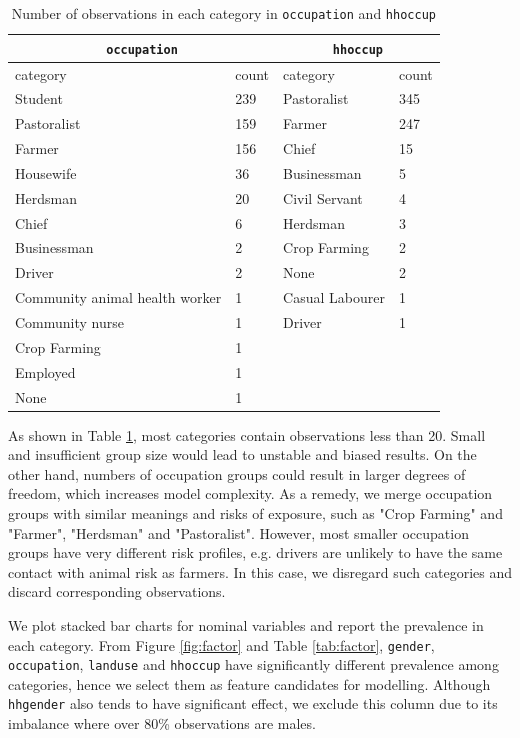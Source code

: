 \documentclass[11pt,twoside]{article}
\numberwithin{Theorem}{section}
\numberwithin{Definition}{section}
\numberwithin{Lemma}{section}
\numberwithin{Algorithm}{section}
\numberwithin{equation}{section}
\begin{document}
\begin{table}[!h]
	\centering
	\begin{tabular}{|l|l|l|l|}
		\hline
		\multicolumn{2}{|c|}{\texttt{occupation}} & \multicolumn{2}{|c|}{\texttt{hhoccup}} \\
		\hline
		category & 	count & category & count \\
		\hline
		Student & 239 & Pastoralist & 345 \\				
		Pastoralist & 159 & Farmer & 247 \\
		Farmer & 156 & Chief & 15 \\
		Housewife & 36	& Businessman & 5 \\			
		Herdsman & 20 & Civil Servant & 4 \\	
		Chief & 6 & Herdsman & 3 \\	
		Businessman & 2 & Crop Farming & 2 \\
		Driver & 2 & None & 2 \\
		Community animal health worker & 1 & Casual Labourer & 1 \\			
		Community nurse & 1	& Driver & 1 \\	
		Crop Farming & 1 & & \\			
		Employed & 1 & & \\
		None & 1 & & \\
		\hline
	\end{tabular}	
	\caption{Number of observations in each category in \texttt{occupation} and \texttt{hhoccup}}
	\label{tab:occ}
\end{table}

 As shown in Table \ref{tab:occ}, most categories contain observations less than 20. Small and insufficient group size would lead to unstable and biased results. On the other hand, numbers of occupation groups could result in larger degrees of freedom, which increases model complexity. As a remedy, we merge occupation groups with similar meanings and risks of exposure, such as "Crop Farming" and "Farmer", "Herdsman" and "Pastoralist". However, most smaller occupation groups have very different risk profiles, e.g. drivers are unlikely to have the same contact with animal risk as farmers. In this case, we disregard such categories and discard corresponding observations.

We plot stacked bar charts for nominal variables and report the prevalence in each category. From Figure \ref{fig:factor} and Table \ref{tab:factor}, \texttt{gender},  \texttt{occupation}, \texttt{landuse} and \texttt{hhoccup} have significantly different prevalence among categories, hence we select them as feature candidates for modelling. Although \texttt{hhgender} also tends to have significant effect, we exclude this column due to its imbalance where over 80\% observations are males.
\end{document}

